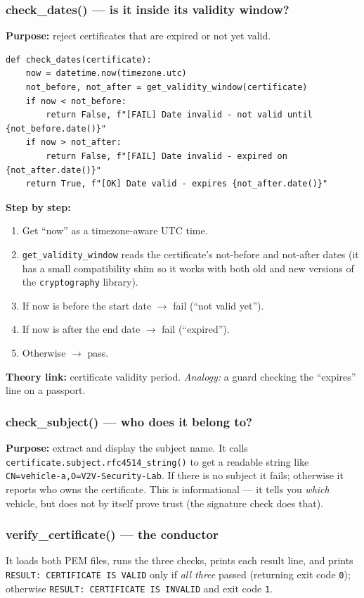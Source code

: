 \documentclass[11pt,a4paper]{article}
\begin{document}
\subsubsection*{check\_dates() --- is it inside its validity window?}
\textbf{Purpose:} reject certificates that are expired or not yet valid.
\begin{lstlisting}[style=py,caption={ca/verify\_cert.py --- validity-date check.}]
def check_dates(certificate):
    now = datetime.now(timezone.utc)
    not_before, not_after = get_validity_window(certificate)
    if now < not_before:
        return False, f"[FAIL] Date invalid - not valid until {not_before.date()}"
    if now > not_after:
        return False, f"[FAIL] Date invalid - expired on {not_after.date()}"
    return True, f"[OK] Date valid - expires {not_after.date()}"
\end{lstlisting}
\textbf{Step by step:}
\begin{enumerate}
  \item Get ``now'' as a timezone-aware UTC time.
  \item \texttt{get\_validity\_window} reads the certificate's not-before and
        not-after dates (it has a small compatibility shim so it works with both
        old and new versions of the \texttt{cryptography} library).
  \item If now is before the start date $\to$ fail (``not valid yet'').
  \item If now is after the end date $\to$ fail (``expired'').
  \item Otherwise $\to$ pass.
\end{enumerate}
\textbf{Theory link:} certificate validity period. \emph{Analogy:} a guard
checking the ``expires'' line on a passport.

\subsubsection*{check\_subject() --- who does it belong to?}
\textbf{Purpose:} extract and display the subject name. It calls
\texttt{certificate.subject.rfc4514\_string()} to get a readable string like
\texttt{CN=vehicle-a,O=V2V-Security-Lab}. If there is no subject it fails;
otherwise it reports who owns the certificate. This is informational --- it tells
you \emph{which} vehicle, but does not by itself prove trust (the signature
check does that).

\subsubsection*{verify\_certificate() --- the conductor}
It loads both PEM files, runs the three checks, prints each result line, and
prints \texttt{RESULT: CERTIFICATE IS VALID} only if \emph{all three} passed
(returning exit code \texttt{0}); otherwise \texttt{RESULT: CERTIFICATE IS
INVALID} and exit code \texttt{1}.
\end{document}
